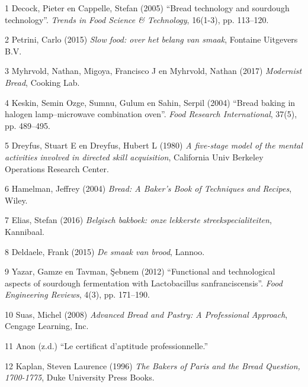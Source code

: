 \documentclass[
  11pt,
  dutch,
]{memoir}
\newlength{\cslhangindent}
\newenvironment{cslreferences}%
  {\setlength{\parindent}{0pt}%
  \everypar{\setlength{\hangindent}{\cslhangindent}}\ignorespaces}%
  {\par}
\begin{document}
\hypertarget{refs}{}
\begin{cslreferences}
\leavevmode\hypertarget{ref-decock2005bread}{}%
1 Decock, Pieter en Cappelle, Stefan (2005) ``Bread technology and
sourdough technology''. \emph{Trends in Food Science \& Technology},
16(1-3), pp. 113--120.

\leavevmode\hypertarget{ref-slowfood}{}%
2 Petrini, Carlo (2015) \emph{Slow food: over het belang van smaak},
Fontaine Uitgevers B.V.

\leavevmode\hypertarget{ref-myhrvold2017modernist}{}%
3 Myhrvold, Nathan, Migoya, Francisco J en Myhrvold, Nathan (2017)
\emph{Modernist Bread}, Cooking Lab.

\leavevmode\hypertarget{ref-keskin2004bread}{}%
4 Keskin, Semin Ozge, Sumnu, Gulum en Sahin, Serpil (2004) ``Bread
baking in halogen lamp--microwave combination oven''. \emph{Food
Research International}, 37(5), pp. 489--495.

\leavevmode\hypertarget{ref-dreyfus1980five}{}%
5 Dreyfus, Stuart E en Dreyfus, Hubert L (1980) \emph{A five-stage model
of the mental activities involved in directed skill acquisition},
California Univ Berkeley Operations Research Center.

\leavevmode\hypertarget{ref-hamelman2004bread}{}%
6 Hamelman, Jeffrey (2004) \emph{Bread: A Baker's Book of Techniques and
Recipes}, Wiley.

\leavevmode\hypertarget{ref-eliasbakboek}{}%
7 Elias, Stefan (2016) \emph{Belgisch bakboek: onze lekkerste
streekspecialiteiten}, Kannibaal.

\leavevmode\hypertarget{ref-deldaele}{}%
8 Deldaele, Frank (2015) \emph{De smaak van brood}, Lannoo.

\leavevmode\hypertarget{ref-yazar2012functional}{}%
9 Yazar, Gamze en Tavman, Şebnem (2012) ``Functional and technological
aspects of sourdough fermentation with Lactobacillus sanfranciscensis''.
\emph{Food Engineering Reviews}, 4(3), pp. 171--190.

\leavevmode\hypertarget{ref-advancedbread}{}%
10 Suas, Michel (2008) \emph{Advanced Bread and Pastry: A Professional
Approach}, Cengage Learning, Inc.

\leavevmode\hypertarget{ref-educationgovfr}{}%
11 Anon (z.d.) ``Le certificat d'aptitude professionnelle.''

\leavevmode\hypertarget{ref-kaplanbakersparis}{}%
12 Kaplan, Steven Laurence (1996) \emph{The Bakers of Paris and the
Bread Question, 1700-1775}, Duke University Press Books.


\end{cslreferences}
\end{document}
